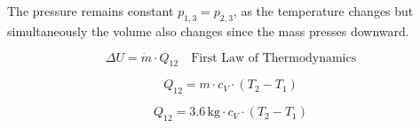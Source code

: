 The pressure remains constant \( p_{1,3} = p_{2,3} \), as the temperature changes but simultaneously the volume also changes since the mass presses downward.

\[
\Delta U = \dot{m} \cdot Q_{12} \quad \text{First Law of Thermodynamics}
\]

\[
Q_{12} = m \cdot c_V \cdot (T_2 - T_1)
\]

\[
Q_{12} = 3.6 \, \text{kg} \cdot c_V \cdot (T_2 - T_1)
\]